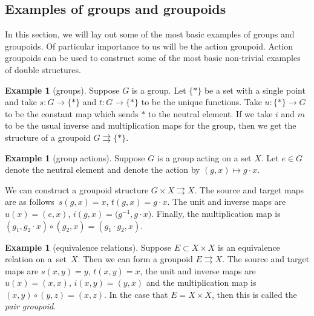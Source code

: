 \documentclass[10pt,a4paper]{amsart}
\numberwithin{equation}{section}
\theoremstyle{definition}
\newtheorem{Example}[Theorem]{Example}
\newcommand{\inv}{^{-1}}
\newcommand{\grpd}{\rightrightarrows}
\begin{document}
\subsection{Examples of groups and groupoids}
In this section, we will lay out some of the most basic examples of groups and groupoids. Of particular importance to us will be the action groupoid. Action groupoids can be used to construct some of the most basic non-trivial examples of double structures.
\begin{Example}[groups]
  Suppose $ G $ is a group.
  Let $ \{ * \} $ be a set with a single point and take $ s \colon G \to \{ * \} $ and $ t \colon G \to \{ * \} $ to be the unique functions.
  Take $ u \colon \{ * \} \to G$ to be the constant map which sends $ * $ to the neutral element.
  If we take $ i $ and $ m$ to be the usual inverse and multiplication maps for the group, then we get the structure of a groupoid $ G \grpd \{ * \} $.
\end{Example}
\begin{Example}[group actions]
Suppose $ G $ is a group acting on a set $ X $.
Let $ e \in G $ denote the neutral element and denote the action by $ (g,x) \mapsto g \cdot x $.

We can construct a groupoid structure $G \times X \grpd X $.
The source and target maps are as follows~${s(g,x) = x}$, $t(g,x) = g \cdot x$.
The unit and inverse maps are $u(x) = (e,x)$, ${i(g,x) = \big(g\inv, g \cdot x \big)}$.
Finally, the multiplication map is $(g_1, g_2 \cdot x) \circ (g_2, x) = (g_1 \cdot g_2, x )$.
\end{Example}

\begin{Example}[equivalence relations]
  Suppose $ E \subset X \times X $ is an equivalence relation on a~set~$ X$.
  Then we can form a groupoid $ E \grpd X $.
   The source and target maps are $s(x,y) = y$, $t(x,y) = x$, the unit and inverse maps are $u(x) = (x,x)$, $i(x,y) = (y,x)$ and the multiplication map is~${(x,y) \circ (y,z) = (x,z)}$. In the case that $ E = X \times X $, then this is called the \emph{pair groupoid}.
\end{Example}
\end{document}
